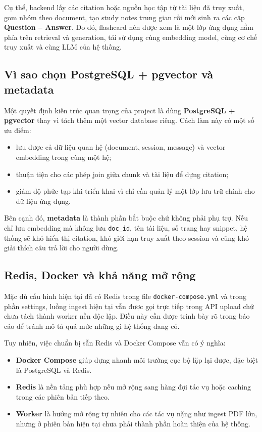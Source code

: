 \documentclass[12pt]{ai_conquer2026}
\begin{document}
Cụ thể, backend lấy các citation hoặc nguồn học tập từ tài liệu đã truy xuất, gom nhóm theo document, tạo study notes trung gian rồi mới sinh ra các cặp \textbf{Question -- Answer}. Do đó, flashcard nên được xem là một lớp ứng dụng nằm phía trên retrieval và generation, tái sử dụng cùng embedding model, cùng cơ chế truy xuất và cùng LLM của hệ thống.
\subsection{Vì sao chọn PostgreSQL + pgvector và metadata}

Một quyết định kiến trúc quan trọng của project là dùng \textbf{PostgreSQL + pgvector} thay vì tách thêm một vector database riêng. Cách làm này có một số ưu điểm:

\begin{itemize}
    \item lưu được cả dữ liệu quan hệ (document, session, message) và vector embedding trong cùng một hệ;
    \item thuận tiện cho các phép join giữa chunk và tài liệu để dựng citation;
    \item giảm độ phức tạp khi triển khai vì chỉ cần quản lý một lớp lưu trữ chính cho dữ liệu ứng dụng.
\end{itemize}

Bên cạnh đó, \textbf{metadata} là thành phần bắt buộc chứ không phải phụ trợ. Nếu chỉ lưu embedding mà không lưu \texttt{doc\_id}, tên tài liệu, số trang hay snippet, hệ thống sẽ khó hiển thị citation, khó giới hạn truy xuất theo session và cũng khó giải thích câu trả lời cho người dùng.

\subsection{Redis, Docker và khả năng mở rộng}

Mặc dù cấu hình hiện tại đã có Redis trong file \texttt{docker-compose.yml} và trong phần settings, luồng ingest hiện tại vẫn được gọi trực tiếp trong API upload chứ chưa tách thành worker nền độc lập. Điều này cần được trình bày rõ trong báo cáo để tránh mô tả quá mức những gì hệ thống đang có.

Tuy nhiên, việc chuẩn bị sẵn Redis và Docker Compose vẫn có ý nghĩa:
\begin{itemize}
    \item \textbf{Docker Compose} giúp dựng nhanh môi trường cục bộ lặp lại được, đặc biệt là PostgreSQL và Redis.
    \item \textbf{Redis} là nền tảng phù hợp nếu mở rộng sang hàng đợi tác vụ hoặc caching trong các phiên bản tiếp theo.
    \item \textbf{Worker} là hướng mở rộng tự nhiên cho các tác vụ nặng như ingest PDF lớn, nhưng ở phiên bản hiện tại chưa phải thành phần hoàn thiện của hệ thống.
\end{itemize}
\end{document}
